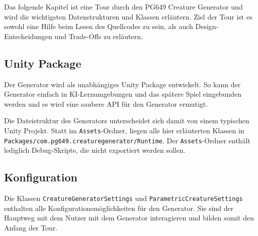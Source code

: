 
Das folgende Kapitel ist eine Tour durch den PG649 Creature Generator und wird die wichtigsten Datenstrukturen und Klassen erläutern.
Ziel der Tour ist es sowohl eine Hilfe beim Lesen des Quellcodes zu sein, als auch Design-Entscheidungen und Trade-Offs zu erläutern.

\subsection{Unity Package}
Der Generator wird als unabhängiges Unity Package entwickelt.
So kann der Generator einfach in KI-Lernumgebungen und das spätere Spiel eingebunden werden und es wird eine saubere API für den Generator ermutigt.

Die Dateistruktur des Generators unterscheidet sich damit von einem typischen Unity Projekt. Statt im \texttt{Assets}-Ordner, liegen alle hier erläuterten Klassen in \linebreak\texttt{Packages/com.pg649.creaturegenerator/Runtime}.
Der \texttt{Assets}-Ordner enthält lediglich Debug-Skripte, die nicht exportiert werden sollen.

\subsection{Konfiguration}
Die Klassen \texttt{Creature\-Generator\-Settings} und \texttt{Parametric\-Creature\-Settings} enthalten alle Konfigurationsmöglichkeiten für den Generator.
Sie sind der Hauptweg mit dem Nutzer mit dem Generator interagieren und bilden somit den Anfang der Tour. 

